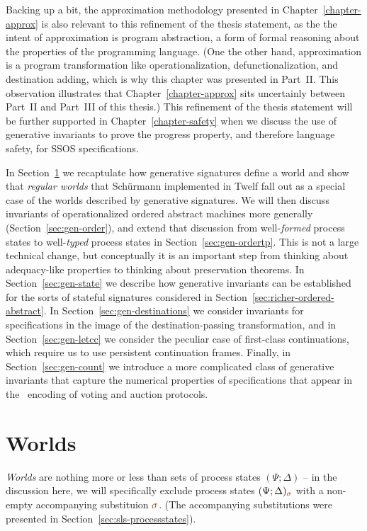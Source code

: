 \noindent
Backing up a bit, the approximation methodology presented in
Chapter~\ref{chapter-approx} is also relevant to this refinement of
the thesis statement, as the the intent of approximation is program
abstraction, a form of formal reasoning about the properties of the
programming language. (One the other hand, approximation is a
  program transformation like operationalization, defunctionalization,
  and destination adding, which is why this chapter was presented in
  Part~II. This observation illustrates that
  Chapter~\ref{chapter-approx} sits uncertainly between Part~II and
  Part~III of this thesis.) This refinement of the thesis statement
will be further supported in Chapter~\ref{chapter-safety} when we
discuss the use of generative invariants to prove the progress
property, and therefore language safety, for SSOS specifications.

In Section~\ref{sec:gen-worlds} we recaptulate how generative
signatures define a world and show that {\it regular worlds} that
Sch\"urmann implemented in Twelf \cite{schurmann00automating} fall out
as a special case of the worlds described by generative signatures.
We will then discuss invariants of operationalized ordered abstract
machines more generally (Section~\ref{sec:gen-order}), and extend that
discussion from well-{\it formed} process states to well-{\it typed}
process states in Section~\ref{sec:gen-ordertp}.  This is not a large
technical change, but conceptually it is an important step from
thinking about adequacy-like properties to thinking about preservation
theorems. In Section~\ref{sec:gen-state} we describe how generative
invariants can be established for the sorts of stateful signatures
considered in Section~\ref{sec:richer-ordered-abstract}. In
Section~\ref{sec:gen-destinations} we consider invariants for
specifications in the image of the destination-passing transformation,
and in Section~\ref{sec:gen-letcc} we consider the peculiar case of
first-class continuations, which require us to use persistent
continuation frames. Finally, in Section~\ref{sec:gen-count} we
introduce a more complicated class of generative invariants that
capture the numerical properties of specifications that appear in the
\sls~encoding of voting and auction protocols.

\section{Worlds}
\label{sec:gen-worlds}

{\it Worlds} are nothing more or less than sets of process states
$(\Psi; \Delta)$ -- in the discussion here, we will specifically
exclude process states $(\Psi; \Delta)_{\lf\sigma}$ with a non-empty
accompanying substituion $\lf\sigma$. (The accompanying substitutions
were presented in Section~\ref{sec:sls-processstates}).

